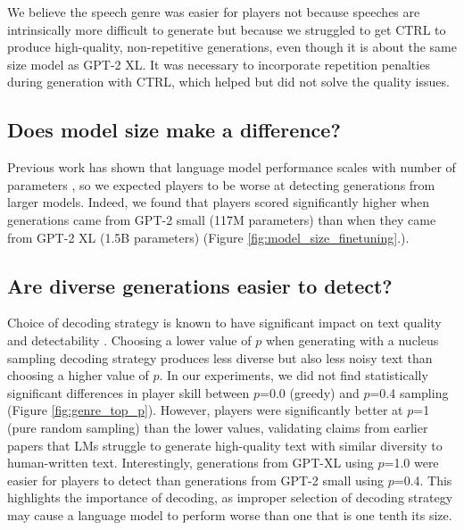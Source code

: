 We believe the speech genre was easier for players not because speeches are intrinsically more difficult to generate but because we struggled to get CTRL to produce high-quality, non-repetitive generations, even though it is about the same size model as GPT-2 XL.
It was necessary to incorporate repetition penalties during generation with CTRL, which helped but did not
solve the quality issues.

\subsection{Does model size make a difference?}
Previous work has shown that language model performance scales with number of parameters \citep{kaplan2020scaling}, so we expected players to be worse at detecting generations from larger models.
Indeed, we found that players scored significantly higher when generations came from GPT-2 small (117M parameters) than when they came from GPT-2 XL (1.5B parameters) (Figure \ref{fig:model_size_finetuning}.).



\subsection{Are diverse generations easier to detect?}
Choice of decoding strategy is known to have significant impact on text quality \citep{zhang2021trading} and detectability \citep{ippolito2020automatic}.
Choosing a lower value of $p$ when generating with a nucleus sampling \citep{holtzman2019curious} decoding strategy produces less diverse but also less noisy text than choosing a higher value of $p$.
In our experiments, we did not find statistically significant differences in player skill between $p$=0.0 (greedy) and $p$=0.4 sampling (Figure \ref{fig:genre_top_p}).
However, players were significantly better at $p$=1 (pure random sampling) than the lower values, 
validating claims from earlier papers that LMs struggle to generate high-quality text with similar diversity to human-written text.
Interestingly, generations from GPT-XL using $p$=1.0 were easier for players to detect than generations from GPT-2 small using $p$=0.4.
This highlights the importance of decoding, as improper selection of decoding strategy may cause a language model to perform worse than one that is one tenth its size.


